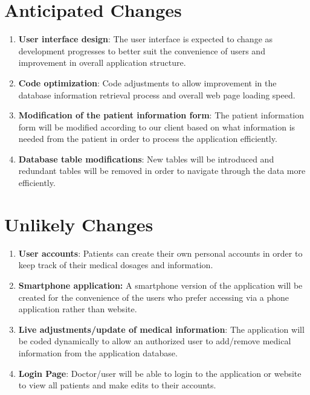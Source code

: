 \documentclass[12pt]{article}
\begin{document}
\section{Anticipated Changes}
\begin{enumerate}
\item \textbf{User interface design}: The user interface is expected to change as development progresses to better suit the convenience of users and improvement in overall application structure.
\item \textbf{Code optimization}: Code adjustments to allow improvement in the database information retrieval process and overall web page loading speed.
\item \textbf{Modification of the patient information form}: The patient information form will be modified according to our client based on what information is needed from the patient in order to process the application efficiently.
\item \textbf{Database table modifications}: New tables will be introduced and redundant tables will be removed in order to navigate through the data more efficiently.
\end{enumerate}

\section{Unlikely Changes}
\begin{enumerate}
\item \textbf{User accounts}: Patients can create their own personal accounts in order to keep track of their medical dosages and information.
\item \textbf{Smartphone application:} A smartphone version of the application will be created for the convenience of the users who prefer accessing via a phone application rather than website.
\item \textbf{Live adjustments/update of medical information}: The application will be coded dynamically to allow an authorized user to add/remove medical information from the application database.
\item \textbf{Login Page}: Doctor/user will be able to login to the application or website to view all patients and make edits to their accounts.
\end{enumerate}
\end{document}
